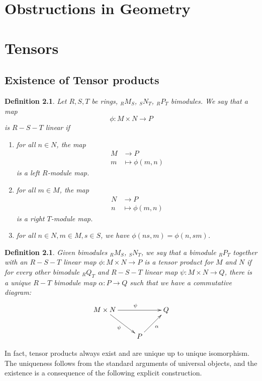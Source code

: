 \documentclass[12pt]{report}
\theoremstyle{plain}
\newtheorem{defn}[thm]{Definition}
\begin{document}
\chapter{Obstructions in Geometry}

\fi

\appendix

\chapter{Tensors}


\section{Existence of Tensor products}

\begin{defn}
Let $R, S, T$ be rings, $_R M_S$, $_S N_T$, $_R P _T$ bimodules. We say
that a map
\[\phi : M \times N \to P\]
is $R-S-T$ linear if
\begin{enumerate}[1. ]
\item for all $n \in N$, the map
\begin{align*}
M &\to P \\
m &\mapsto \phi(m, n)
\end{align*}
is a left $R$-module map.
\item for all $m \in M$, the map
\begin{align*}
N &\to P \\
n &\mapsto \phi(m, n)
\end{align*}
is a right $T$-module map.
\item for all $n \in N, m \in M, s \in S$, we have $\phi(ns, m) = \phi(n,
sm)$.
\end{enumerate}
\end{defn}

\begin{defn}
Given bimodules $ _R M_S$, $_S N_T$, we say that a bimodule $ _R P_T$
together with an $R-S-T$ linear map $\phi: M \times N \to P$ is a tensor product
for $M$ and $N$ if for every other bimodule $_R Q_T$ and $R-S-T$ linear map
$\psi : M \times N \to Q$, there is a unique $R-T$ bimodule map $\alpha : P
\to Q$ such that we have a commutative diagram:
\[\xymatrix{
M \times N \ar[rd]_{\psi} \ar[rr]^\psi & & Q \\
 & P \ar[ru]_{\alpha}
}\]
\end{defn}

In fact, tensor products always exist and are unique up to unique
isomorphism. The uniqueness follows from the standard arguments of
universal objects, and the existence is a consequence of the following
explicit construction.
\end{document}
